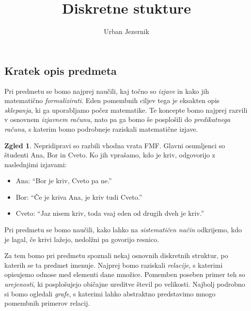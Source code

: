 \documentclass[11pt]{book}
\title{\bf Diskretne stukture}
\author{Urban Jezernik}
\theoremstyle{definition}
\theoremstyle{zgled}
\newtheorem*{zgled}{Zgled}
\theoremstyle{odprtproblem}
\theoremstyle{domacanaloga}
\theoremstyle{izrek}
\begin{document}
\baselineskip=14pt

\maketitle

\setcounter{tocdepth}{1}
\tableofcontents

\newpage

\subsection*{Kratek opis predmeta}

Pri predmetu se bomo najprej naučili, kaj točno so \emph{izjave} in kako jih matematično \emph{formalizirati}. Eden pomembnih ciljev tega je eksakten opis  \emph{sklepanja}, ki ga uporabljamo počez matematike. Te koncepte bomo najprej razvili v osnovnem \emph{izjavnem računu}, nato pa ga bomo še posplošili do \emph{predikatnega računa}, s katerim bomo podrobneje raziskali matematične izjave. 

\begin{zgled}
Nepridipravi so razbili vhodna vrata FMF. Glavni osumljenci so študenti Ana, Bor in Cveto. Ko jih vprašamo, kdo je kriv, odgovorijo z naslednjimi izjavami:

\begin{itemize}
    \item Ana: ``Bor je kriv, Cveto pa ne.''
    \item Bor: ``Če je kriva Ana, je kriv tudi Cveto.''
    \item Cveto: ``Jaz nisem kriv, toda vsaj eden od drugih dveh je kriv.''
\end{itemize}

Pri predmetu se bomo naučili, kako lahko na \emph{sistematičen način} odkrijemo, kdo je lagal, če krivi lažejo, nedolžni pa govorijo resnico.
\end{zgled}

Za tem bomo pri predmetu spoznali nekaj osnovnih diskretnih struktur, po katerih se ta predmet imenuje. Najprej bomo raziskali \emph{relacije}, s katerimi opisujemo odnose med elementi dane množice. Pomemben poseben primer teh so \emph{urejenosti}, ki posplošujejo običajne ureditve števil po velikosti. Najbolj podrobno si bomo ogledali \emph{grafe}, s katerimi lahko abstraktno predstavimo mnogo pomembnih primerov relacij.
\end{document}
